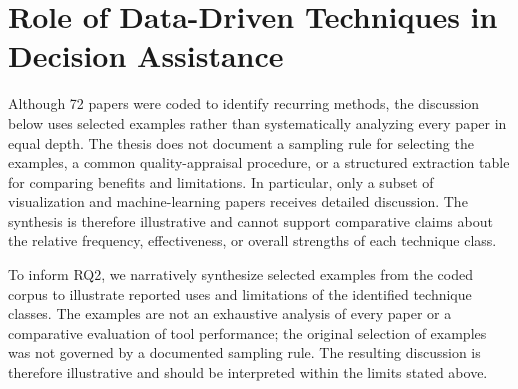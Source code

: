 \documentclass{sfuthesis}
\begin{document}
\section{Role of Data-Driven Techniques in Decision Assistance}
Although 72 papers were coded to identify recurring methods, the discussion below uses selected examples rather than systematically analyzing every paper in equal depth. The thesis does not document a sampling rule for selecting the examples, a common quality-appraisal procedure, or a structured extraction table for comparing benefits and limitations. In particular, only a subset of visualization and machine-learning papers receives detailed discussion. The synthesis is therefore illustrative and cannot support comparative claims about the relative frequency, effectiveness, or overall strengths of each technique class.\par
To inform RQ2, we narratively synthesize selected examples from the coded corpus to illustrate reported uses and limitations of the identified technique classes. The examples are not an exhaustive analysis of every paper or a comparative evaluation of tool performance; the original selection of examples was not governed by a documented sampling rule. The resulting discussion is therefore illustrative and should be interpreted within the limits stated above.\par
\end{document}
